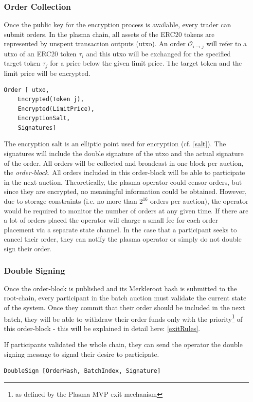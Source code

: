 \documentclass[11pt,parskip=full]{scrartcl}%
\def\pO{\mathcal{O}}
\def\ra{\rightarrow}
\newcommand*{\erc}{ERC20 }
\begin{document}
\subsubsection{Order Collection}
\label{orderblock}
Once the public key for the encryption process is available, every trader can submit orders. 
In the plasma chain, all assets of the ERC20 tokens are represented by unspent transaction outputs (utxo). 
An order $\pO_{i\ra j}$ will refer to a utxo of an \erc token $\tau_i$ and this utxo will be exchanged for the specified target token $\tau_j$ for a price below the given limit price. The target token and the limit price will be encrypted.

\begin{verbatim}
Order [ utxo,
    Encrypted(Token j),
    Encrypted(LimitPrice),
    EncryptionSalt,
    Signatures]
\end{verbatim} 
The encryption salt is an elliptic point used for encryption (cf. \ref{salt}). The signatures will include the double signature of the utxo and the actual signature of the order.
All orders will be collected and broadcast in one block per auction, the \emph{order-block}. 
All orders included in this order-block will be able to participate in the next auction. 
Theoretically, the plasma operator could censor orders, but since they are encrypted, no meaningful information could be obtained.
However, due to storage constraints (i.e. no more than $2^{16}$ orders per auction), the operator would be required to monitor the number of orders at any given time.
If there are a lot of orders placed the operator will charge a small fee for each order placement via a separate state channel. 
In the case that a participant seeks to cancel their order, they can notify the plasma operator or simply do not double sign their order. 

\subsubsection{Double Signing}
Once the order-block is published and its Merkleroot hash is submitted to the root-chain, every participant in the batch auction must validate the current state of the system. 
Once they commit that their order should be included in the next batch, they will be able to withdraw their order funds only with the priority\footnote{as defined by the Plasma MVP exit mechanism} of this order-block - this will be explained in detail here: \ref{exitRules}.

If participants validated the whole chain, they can send the operator the double signing message to signal their desire to participate. 
\begin{verbatim}
DoubleSign [OrderHash, BatchIndex, Signature]
\end{verbatim}
\end{document}
